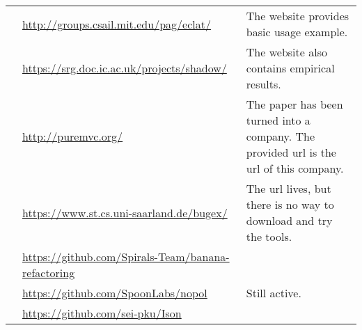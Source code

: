 \begin{table*}[ht]
\begin{tabularx}{\textwidth}{lXX}
	    \cite{Pacheco2005}                        & \url{http://groups.csail.mit.edu/pag/eclat/}                      & The website provides basic usage example.\\
	    \cite{palikareva2016shadow}               & \url{https://srg.doc.ic.ac.uk/projects/shadow/}                   & The website also contains empirical results.\\
	    \cite{pezze2013}                          & \url{http://puremvc.org/}                                         & The paper has been turned into a company. The provided url is the url of this company.\\
	    \cite{robetaler2012isolating}             & \url{https://www.st.cs.uni-saarland.de/bugex/}                    & The url lives, but there is no way to download and try the tools. \\
	    \cite{xuan:hal-01309004}                  & \url{https://github.com/Spirals-Team/banana-refactoring}          & \\
	    \cite{xuanTSE2016Nopol}                   & \url{https://github.com/SpoonLabs/nopol}                          & Still active. \\
	    \cite{Zhang2016Isomorphic}                & \url{https://github.com/sei-pku/Ison}                             & \\
	    \bottomrule
	\end{tabularx}
\end{table*}
